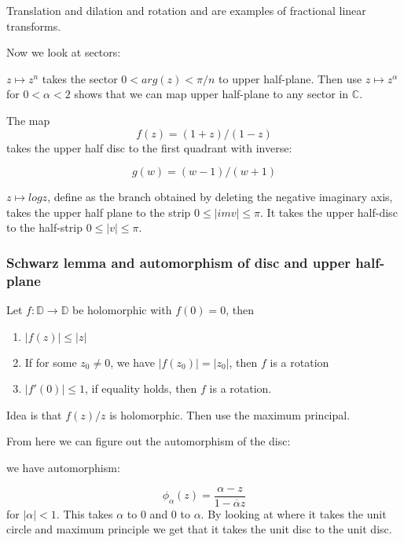 \documentclass[main.tex]{subfiles}
\begin{document}
Translation and dilation and rotation and are examples of fractional linear transforms.

Now we look at sectors:

\begin{example}
$z \mapsto z^n$ takes the sector $0 < arg(z) < \pi/n$ to upper half-plane.
Then use $z \mapsto z^\alpha$ for $0 < \alpha < 2$ shows that we can map upper half-plane to any sector in $\mathbb{C}$.
\end{example}

\begin{example}
The map 
$$
f(z) = (1 + z)/(1 -z)
$$
takes the upper half disc to the first quadrant with inverse:

$$
g(w) = (w-1)/(w+1)
$$
\end{example}

\begin{example}
$z \mapsto log z$, define as the branch obtained by deleting the negative imaginary axis, takes the upper half plane to the strip $0 \leq |im v| \leq \pi$. It takes the upper half-disc to the half-strip $0 \leq |v| \leq \pi$.
\end{example}


\subsubsection{Schwarz lemma and automorphism of disc and upper half-plane}

\begin{lemma}
Let $f: \mathbb{D} \rightarrow \mathbb{D}$ be holomorphic with $f(0) = 0$, then
\begin{enumerate}
    \item $|f(z)| \leq |z|$
    \item If for some $z_0 \neq 0$, we have $|f(z_0)| = |z_0|$, then $f$ is a rotation
    \item $|f'(0)| \leq 1$, if equality holds, then $f$ is a rotation.
\end{enumerate}
\end{lemma}

Idea is that $f(z)/z$ is holomorphic. Then use the maximum principal.

From here we can figure out the automorphism of the disc:

we have automorphism:

$$
\phi_\alpha(z) = \frac{\alpha - z}{1 - \overline{\alpha} z}
$$
for $|\alpha| < 1$. This takes $\alpha$ to $0$ and $0$ to $\alpha$. By looking at where it takes the unit circle and maximum principle we get that it takes the unit disc to the unit disc.
\end{document}
